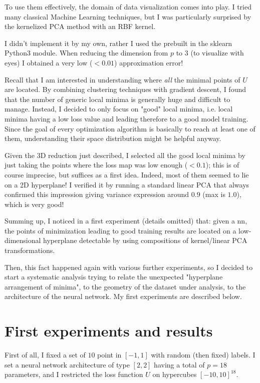 \documentclass{article}
\begin{document}
To use them effectively, the domain of data visualization comes into play.
I tried many classical Machine Learning techniques, but I was particularly
surprised by the kernelized PCA method with an RBF kernel.


I didn't implement it by my own, rather I used the prebuilt in the sklearn
Python3 module. When reducing the dimension from $p$ to $3$
(to visualize with eyes) I obtained a very low
($< 0.01$) approximation error! 


Recall that I am interested in understanding where \emph{all} 
the minimal points of
$U$ are located. By combining clustering techniques with gradient descent,
I found that the number of generic local minima is generally huge and
difficult to manage. Instead, I decided to only focus on "good" local minima,
i.e. local minima having a low loss value and leading therefore
to a good model training. Since the goal of every optimization algorithm
is basically to reach at least one of them, understanding their
space distribution might be helpful anyway.


Given the 3D reduction just described, I selected all the good local
minima by just taking the points where the loss map was low enough ($< 0.1$);
this is of course imprecise, but suffices as a first idea.
Indeed, most of them seemed to lie on a 2D hyperplane!
I verified it by running a standard linear PCA that always confirmed
this impression giving variance expression around $0.9$ (max is $1.0$),
which is very good!


Summing up, I noticed in a first experiment (details omitted) that: given a nn, 
the points of minimization leading to good training results
are located on a low-dimensional hyperplane detectable by using compositions
of kernel/linear PCA transformations.


Then, this fact happened again with various further experiments,
so I decided to start a systematic analysis trying to relate
the unexpected "hyperplane arrangement of minima", to the geometry
of the dataset under analysis, to the architecture of the neural network.
My first experiments are described below.


\section{First experiments and results}
First of all, I fixed a set of $10$ point in $[-1, 1]$ with random
(then fixed) labels.
I set a neural network architecture of type $[2, 2]$ having a total
of $p = 18$ parameters, and I restricted the loss function $U$ on hypercubes
$[-10, 10]^{18}$.
\end{document}

